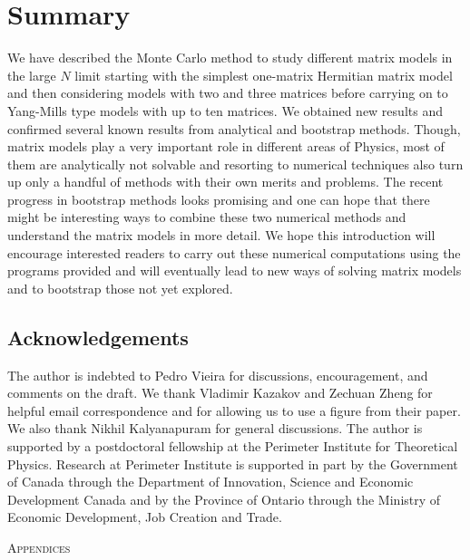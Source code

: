 \documentclass[letter,11pt]{article}
\begin{document}
\section{Summary}
We have described the Monte Carlo method to study different matrix models in the large $N$ limit starting with the simplest one-matrix Hermitian matrix model and then considering models with two and three matrices before carrying on to Yang-Mills type models with up to ten matrices. We obtained new results and confirmed several known results from analytical and bootstrap methods. Though, matrix models play a very important role in different areas of Physics, most of them are analytically not solvable and resorting to numerical techniques also turn up only a handful of methods with their own merits and problems. The recent progress in bootstrap methods looks promising and one can hope that there might be interesting ways to combine these two numerical methods and understand the matrix models in more detail. We hope this introduction will encourage interested readers to carry out these numerical computations using the programs provided and will eventually lead to new ways of solving matrix models and to bootstrap those not yet explored.
\vspace{8mm}
\subsection*{Acknowledgements}
The author is indebted to Pedro Vieira
for discussions, encouragement, and comments on the draft.
We thank Vladimir Kazakov 
and Zechuan Zheng for helpful email correspondence and for 
allowing us to use a figure from their paper. 
We also thank Nikhil Kalyanapuram for general discussions. 
The author is supported by a 
postdoctoral fellowship at the Perimeter Institute for Theoretical Physics. 
Research at Perimeter Institute is supported in part by the Government of Canada through the Department of Innovation, 
Science and Economic Development Canada and by the Province of Ontario through the Ministry of Economic Development, Job Creation and Trade. 
\vspace{6mm}
\appendix
\begin{center} \large{\textsc{Appendices}}\end{center}
\end{document}
